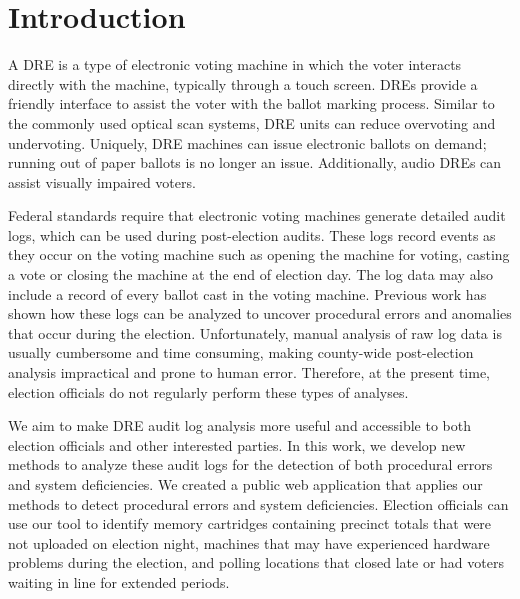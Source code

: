 \bigvertspace
\section{Introduction}
\smvertspace
A DRE is a type of electronic voting machine in which the
voter interacts directly with the machine, typically through a touch
screen. DREs provide a friendly interface to assist the voter with the
ballot marking process. Similar to the commonly used optical scan
systems, DRE units can reduce overvoting and undervoting. Uniquely,
DRE machines can issue electronic ballots on demand; running out of
paper ballots is no longer an issue. Additionally, audio DREs can
assist visually impaired voters.
 
Federal standards require that electronic voting machines generate
detailed audit logs, which can be used during post-election
audits. These logs record events as they occur on the voting machine 
such as opening the machine for voting, casting a vote or closing the
machine at the end of election day. The log data may also include a
record of every ballot cast in the voting machine.  Previous work has
shown how these logs can be analyzed to uncover procedural errors and
anomalies that occur during the election\cite{Buell2011}.
Unfortunately, manual analysis of raw log data is usually cumbersome
and time consuming, making county-wide post-election analysis
impractical and prone to human error. Therefore, at the present time,
election officials do not regularly perform these types of analyses. 

We aim to make DRE audit log analysis more useful and accessible to
both election officials and other interested parties. In this work, we
develop new methods to analyze these audit logs for the detection of
both procedural errors and system deficiencies. We created a public
web application that applies our methods to detect procedural errors
and system deficiencies.  Election officials can use our tool to
identify memory cartridges containing precinct totals that were not
uploaded on election night, machines that may have experienced
hardware problems during the election, and polling locations that
closed late or had voters waiting in line for extended periods.
 
